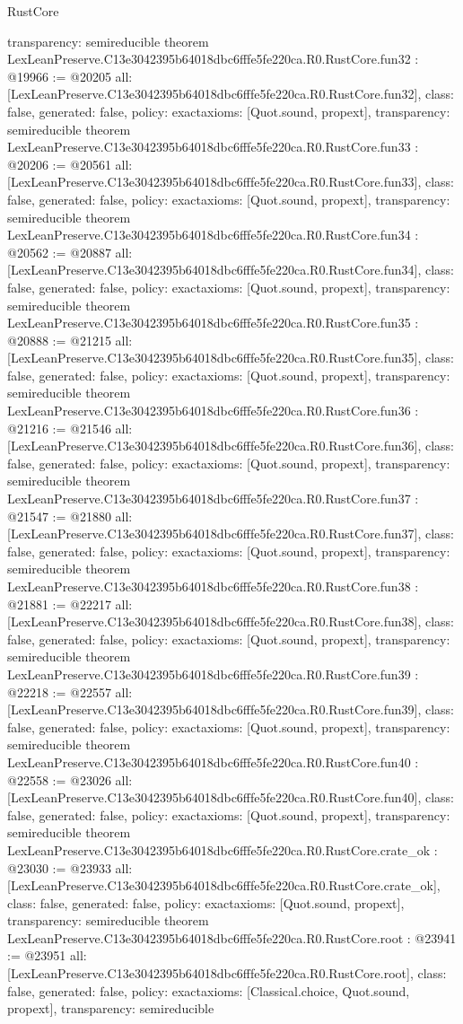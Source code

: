 \begin{lexlean}{RustCore}
\begin{coremodule}
{  transparency: semireducible
}
theorem LexLeanPreserve.C13e3042395b64018dbc6fffe5fe220ca.R0.RustCore.fun32 : @19966 := @20205 {
  all: [LexLeanPreserve.C13e3042395b64018dbc6fffe5fe220ca.R0.RustCore.fun32],
  class: false,
  generated: false,
  policy: exact{axioms: [Quot.sound, propext]},
  transparency: semireducible
}
theorem LexLeanPreserve.C13e3042395b64018dbc6fffe5fe220ca.R0.RustCore.fun33 : @20206 := @20561 {
  all: [LexLeanPreserve.C13e3042395b64018dbc6fffe5fe220ca.R0.RustCore.fun33],
  class: false,
  generated: false,
  policy: exact{axioms: [Quot.sound, propext]},
  transparency: semireducible
}
theorem LexLeanPreserve.C13e3042395b64018dbc6fffe5fe220ca.R0.RustCore.fun34 : @20562 := @20887 {
  all: [LexLeanPreserve.C13e3042395b64018dbc6fffe5fe220ca.R0.RustCore.fun34],
  class: false,
  generated: false,
  policy: exact{axioms: [Quot.sound, propext]},
  transparency: semireducible
}
theorem LexLeanPreserve.C13e3042395b64018dbc6fffe5fe220ca.R0.RustCore.fun35 : @20888 := @21215 {
  all: [LexLeanPreserve.C13e3042395b64018dbc6fffe5fe220ca.R0.RustCore.fun35],
  class: false,
  generated: false,
  policy: exact{axioms: [Quot.sound, propext]},
  transparency: semireducible
}
theorem LexLeanPreserve.C13e3042395b64018dbc6fffe5fe220ca.R0.RustCore.fun36 : @21216 := @21546 {
  all: [LexLeanPreserve.C13e3042395b64018dbc6fffe5fe220ca.R0.RustCore.fun36],
  class: false,
  generated: false,
  policy: exact{axioms: [Quot.sound, propext]},
  transparency: semireducible
}
theorem LexLeanPreserve.C13e3042395b64018dbc6fffe5fe220ca.R0.RustCore.fun37 : @21547 := @21880 {
  all: [LexLeanPreserve.C13e3042395b64018dbc6fffe5fe220ca.R0.RustCore.fun37],
  class: false,
  generated: false,
  policy: exact{axioms: [Quot.sound, propext]},
  transparency: semireducible
}
theorem LexLeanPreserve.C13e3042395b64018dbc6fffe5fe220ca.R0.RustCore.fun38 : @21881 := @22217 {
  all: [LexLeanPreserve.C13e3042395b64018dbc6fffe5fe220ca.R0.RustCore.fun38],
  class: false,
  generated: false,
  policy: exact{axioms: [Quot.sound, propext]},
  transparency: semireducible
}
theorem LexLeanPreserve.C13e3042395b64018dbc6fffe5fe220ca.R0.RustCore.fun39 : @22218 := @22557 {
  all: [LexLeanPreserve.C13e3042395b64018dbc6fffe5fe220ca.R0.RustCore.fun39],
  class: false,
  generated: false,
  policy: exact{axioms: [Quot.sound, propext]},
  transparency: semireducible
}
theorem LexLeanPreserve.C13e3042395b64018dbc6fffe5fe220ca.R0.RustCore.fun40 : @22558 := @23026 {
  all: [LexLeanPreserve.C13e3042395b64018dbc6fffe5fe220ca.R0.RustCore.fun40],
  class: false,
  generated: false,
  policy: exact{axioms: [Quot.sound, propext]},
  transparency: semireducible
}
theorem LexLeanPreserve.C13e3042395b64018dbc6fffe5fe220ca.R0.RustCore.crate_ok : @23030 := @23933 {
  all: [LexLeanPreserve.C13e3042395b64018dbc6fffe5fe220ca.R0.RustCore.crate_ok],
  class: false,
  generated: false,
  policy: exact{axioms: [Quot.sound, propext]},
  transparency: semireducible
}
theorem LexLeanPreserve.C13e3042395b64018dbc6fffe5fe220ca.R0.RustCore.root : @23941 := @23951 {
  all: [LexLeanPreserve.C13e3042395b64018dbc6fffe5fe220ca.R0.RustCore.root],
  class: false,
  generated: false,
  policy: exact{axioms: [Classical.choice, Quot.sound, propext]},
  transparency: semireducible
}


\end{coremodule}
\end{lexlean}
